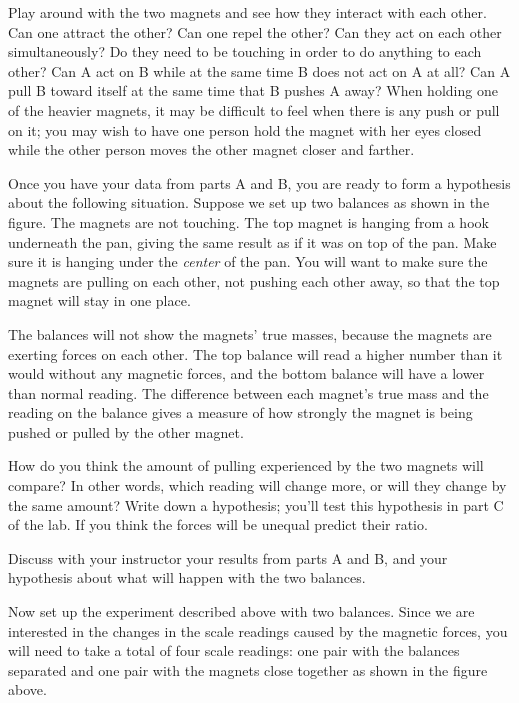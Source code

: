 
Play around with the two magnets and see how they interact
with each other. Can one attract the other?  Can one repel
the other?  Can they act on each other simultaneously? Do
they need to be touching in order to do anything to each
other?   Can A act on B while at the same time B does
not act on A at all?  Can A pull B toward itself at the
same time that B pushes A away?  When holding one of the
heavier magnets, it may be difficult to feel when there is
any push or pull on it; you may wish to have one person hold
the magnet with her eyes closed while the other person moves
the other magnet closer and farther.


Once you have your data from parts A and B, you are
ready to form a hypothesis about the following situation. 
Suppose we set up two balances as shown in the figure.  The
magnets are not touching.  The top magnet is hanging from a
hook underneath the pan, giving the same result as if it was
on top of the pan.  Make sure it is hanging under the
\emph{center} of the pan. You will want to make sure the
magnets are pulling on each other, not pushing each other
away, so that the top magnet will stay in one place.


The balances will not show the magnets' true masses, because
the magnets are exerting forces on each other.  The top
balance will read a higher number than it would without any
magnetic forces, and the bottom balance will have a lower
than normal reading.  The difference between each magnet's
true mass and the reading on the balance gives a measure of
how strongly the magnet is being pushed or pulled by the other magnet.

How do you think the amount of pulling experienced
by the two magnets will compare?  In other words, which
reading will change more, or will they change by the same
amount?  Write down a hypothesis;  you'll test this
hypothesis in part C of the lab. If you think the forces
will be unequal predict their ratio.

Discuss with your instructor your results from parts A and
B, and your hypothesis about what will happen with the two
balances.

Now set up the experiment described above with two balances.
 Since we are interested in the changes in the scale
readings caused by the magnetic forces, you will need to
take a total of four scale readings: one pair with the
balances separated and one pair with the magnets close
together as shown in the figure above.

